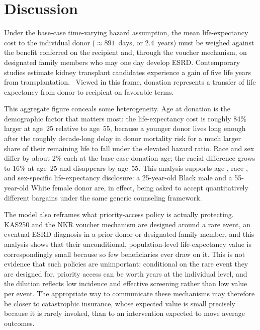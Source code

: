 \section{Discussion}
\label{sec:discussion}
Under the base-case time-varying hazard assumption, the mean life-expectancy cost to the individual donor ($\approx 891$~days, or 2.4~years) must be weighed against the benefit conferred on the recipient and, through the voucher mechanism, on designated family members who may one day develop ESRD. Contemporary studies estimate kidney transplant candidates experience a gain of five life years from transplantation.~\cite{stedman2025estimating} Viewed in this frame, donation represents a transfer of life expectancy from donor to recipient on favorable terms.

This aggregate figure conceals some heterogeneity. Age at donation is the demographic factor that matters most: the life-expectancy cost is roughly 84\% larger at age~25 relative to age~55, because a younger donor lives long enough after the roughly decade-long delay in donor mortality risk for a much larger share of their remaining life to fall under the elevated hazard ratio. Race and sex differ by about 2\% each at the base-case donation age; the racial difference grows to 16\% at age~25 and disappears by age~55. This analysis supports age-, race-, and sex-specific life-expectancy disclosure: a 25-year-old Black male and a 55-year-old White female donor are, in effect, being asked to accept quantitatively different bargains under the same generic counseling framework.

The model also reframes what priority-access policy is actually protecting. KAS250 and the NKR voucher mechanism are designed around a rare event, an eventual ESRD diagnosis in a prior donor or designated family member, and this analysis shows that their unconditional, population-level life-expectancy value is correspondingly small because so few beneficiaries ever draw on it. This is not evidence that such policies are unimportant: conditional on the rare event they are designed for, priority access can be worth years at the individual level, and the dilution reflects low incidence and effective screening rather than low value per event. The appropriate way to communicate these mechanisms may therefore be closer to catastrophic insurance, whose expected value is small precisely because it is rarely invoked, than to an intervention expected to move average outcomes.

